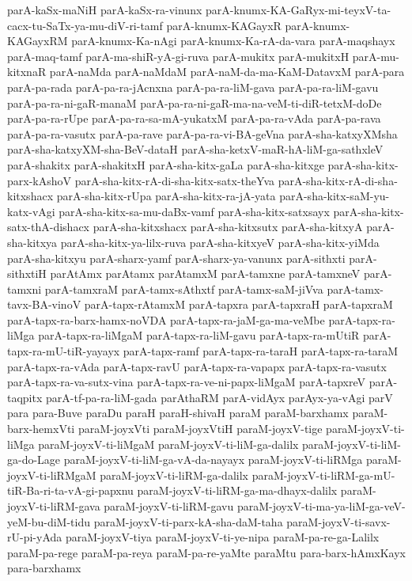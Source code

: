 {parA-kaSx-maNiH
parA-kaSx-ra-vinunx
parA-knumx-KA-GaRyx-mi-teyxV-ta-cacx-tu-SaTx-ya-mu-diV-ri-tamf
parA-knumx-KAGayxR
parA-knumx-KAGayxRM
parA-knumx-Ka-nAgi
parA-knumx-Ka-rA-da-vara
parA-maqshayx
parA-maq-tamf
parA-ma-shiR-yA-gi-ruva
parA-mukitx
parA-mukitxH
parA-mu-kitxnaR
parA-naMda
parA-naMdaM
parA-naM-da-ma-KaM-DatavxM
parA-para
parA-pa-rada
parA-pa-ra-jAcnxna
parA-pa-ra-liM-gava
parA-pa-ra-liM-gavu
parA-pa-ra-ni-gaR-manaM
parA-pa-ra-ni-gaR-ma-na-veM-ti-diR-tetxM-doDe
parA-pa-ra-rUpe
parA-pa-ra-sa-mA-yukatxM
parA-pa-ra-vAda
parA-pa-rava
parA-pa-ra-vasutx
parA-pa-rave
parA-pa-ra-vi-BA-geVna
parA-sha-katxyXMsha
parA-sha-katxyXM-sha-BeV-dataH
parA-sha-ketxV-maR-hA-liM-ga-sathxleV
parA-shakitx
parA-shakitxH
parA-sha-kitx-gaLa
parA-sha-kitxge
parA-sha-kitx-parx-kAshoV
parA-sha-kitx-rA-di-sha-kitx-satx-theYva
parA-sha-kitx-rA-di-sha-kitxshacx
parA-sha-kitx-rUpa
parA-sha-kitx-ra-jA-yata
parA-sha-kitx-saM-yu-katx-vAgi
parA-sha-kitx-sa-mu-daBx-vamf
parA-sha-kitx-satxsayx
parA-sha-kitx-satx-thA-dishacx
parA-sha-kitxshacx
parA-sha-kitxsutx
parA-sha-kitxyA
parA-sha-kitxya
parA-sha-kitx-ya-lilx-ruva
parA-sha-kitxyeV
parA-sha-kitx-yiMda
parA-sha-kitxyu
parA-sharx-yamf
parA-sharx-ya-vanunx
parA-sithxti
parA-sithxtiH
parAtAmx
parAtamx
parAtamxM
parA-tamxne
parA-tamxneV
parA-tamxni
parA-tamxraM
parA-tamx-sAthxtf
parA-tamx-saM-jiVva
parA-tamx-tavx-BA-vinoV
parA-tapx-rAtamxM
parA-tapxra
parA-tapxraH
parA-tapxraM
parA-tapx-ra-barx-hamx-noVDA
parA-tapx-ra-jaM-ga-ma-veMbe
parA-tapx-ra-liMga
parA-tapx-ra-liMgaM
parA-tapx-ra-liM-gavu
parA-tapx-ra-mUtiR
parA-tapx-ra-mU-tiR-yayayx
parA-tapx-ramf
parA-tapx-ra-taraH
parA-tapx-ra-taraM
parA-tapx-ra-vAda
parA-tapx-ravU
parA-tapx-ra-vapapx
parA-tapx-ra-vasutx
parA-tapx-ra-va-sutx-vina
parA-tapx-ra-ve-ni-papx-liMgaM
parA-tapxreV
parA-taqpitx
parA-tf-pa-ra-liM-gada
parAthaRM
parA-vidAyx
parAyx-ya-vAgi
parV
para
para-Buve
paraDu
paraH
paraH-shivaH
paraM
paraM-barxhamx
paraM-barx-hemxVti
paraM-joyxVti
paraM-joyxVtiH
paraM-joyxV-tige
paraM-joyxV-ti-liMga
paraM-joyxV-ti-liMgaM
paraM-joyxV-ti-liM-ga-dalilx
paraM-joyxV-ti-liM-ga-do-Lage
paraM-joyxV-ti-liM-ga-vA-da-nayayx
paraM-joyxV-ti-liRMga
paraM-joyxV-ti-liRMgaM
paraM-joyxV-ti-liRM-ga-dalilx
paraM-joyxV-ti-liRM-ga-mU-tiR-Ba-ri-ta-vA-gi-papxnu
paraM-joyxV-ti-liRM-ga-ma-dhayx-dalilx
paraM-joyxV-ti-liRM-gava
paraM-joyxV-ti-liRM-gavu
paraM-joyxV-ti-ma-ya-liM-ga-veV-yeM-bu-diM-tidu
paraM-joyxV-ti-parx-kA-sha-daM-taha
paraM-joyxV-ti-savx-rU-pi-yAda
paraM-joyxV-tiya
paraM-joyxV-ti-ye-nipa
paraM-pa-re-ga-Lalilx
paraM-pa-rege
paraM-pa-reya
paraM-pa-re-yaMte
paraMtu
para-barx-hAmxKayx
para-barxhamx
}
